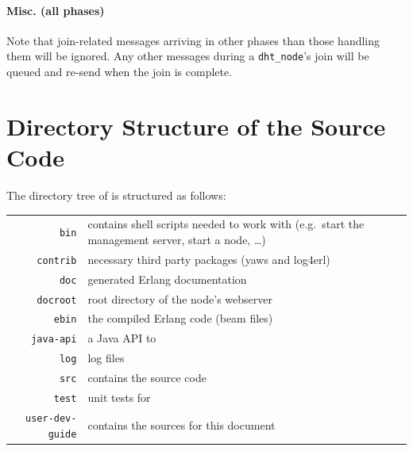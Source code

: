\documentclass[a4paper]{scrreprt}
\newcommand{\code}[1]{\lstinline[basicstyle=\ttfamily]!#1!}
\begin{document}
\subsubsection{Misc. (all phases)}

Note that join-related messages arriving in other phases than those handling
them will be ignored. Any other messages during a \code{dht_node}'s join will
be queued and re-send when the join is complete.

\chapter{Directory Structure of the Source Code}

The directory tree of \scalaris{} is structured as follows:

\vspace*{1em}
\begin{tabular}{|r|p{11.5cm}|}
 \hline
 \code{bin} & contains shell scripts needed to work with \scalaris{} (e.g.\ start the management server, start a node, \dots)\\
 \code{contrib} & necessary third party packages (yaws and log4erl) \\
 \code{doc} & generated Erlang documentation \\
 \code{docroot} & root directory of the node's webserver \\
 \code{ebin} & the compiled Erlang code (beam files)\\
 \code{java-api} & a Java API to \scalaris{} \\
 \code{log} & log files \\
 \code{src} & contains the \scalaris{} source code\\
 \code{test} & unit tests for \scalaris{} \\
 \code{user-dev-guide} & contains the sources for this document\\
 \hline
\end{tabular}





\end{document}
